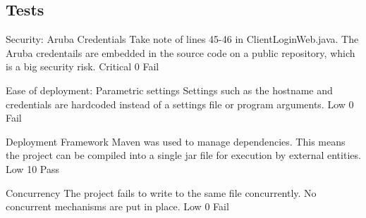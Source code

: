 \subsection{Tests}
\NonFuncReq
{Security: Aruba Credentials}
{Take note of lines 45-46 in ClientLoginWeb.java. The Aruba credentails are embedded in the source code on a public repository, which is a big security risk.}
{Critical}
{0}
{Fail}

\NonFuncReq
{Ease of deployment: Parametric settings}
{Settings such as the hostname and credentials are hardcoded instead of a settings file or program arguments.}
{Low}
{0}
{Fail}

\NonFuncReq
{Deployment Framework}
{Maven was used to manage dependencies. This means the project can be compiled into a single jar file for execution by external entities.}
{Low}
{10}
{Pass}

\NonFuncReq
{Concurrency}
{The project fails to write to the same file concurrently. No  concurrent mechanisms are put in place.}
{Low}
{0}
{Fail}
